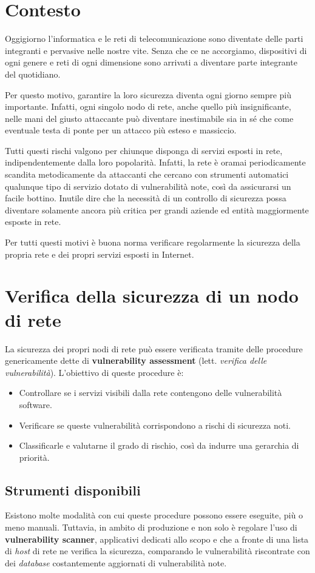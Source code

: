 \section{Contesto}
Oggigiorno l'informatica e le reti di telecomunicazione sono diventate delle parti integranti e pervasive nelle nostre vite. Senza che ce ne accorgiamo, dispositivi di ogni genere e reti di ogni dimensione sono arrivati a diventare parte integrante del quotidiano.

Per questo motivo, garantire la loro sicurezza diventa ogni giorno sempre più importante. Infatti, ogni singolo nodo di rete, anche quello più insignificante, nelle mani del giusto attaccante può diventare inestimabile sia in sé che come eventuale testa di ponte per un attacco più esteso e massiccio.

Tutti questi rischi valgono per chiunque disponga di servizi esposti in rete, indipendentemente dalla loro popolarità. Infatti, la rete è oramai periodicamente scandita metodicamente da attaccanti che cercano con strumenti automatici qualunque tipo di servizio dotato di vulnerabilità note, così da assicurarsi un facile bottino. Inutile dire che la necessità di un controllo di sicurezza possa diventare solamente ancora più critica per grandi aziende ed entità maggiormente esposte in rete.

Per tutti questi motivi è buona norma verificare regolarmente la sicurezza della propria rete e dei propri servizi esposti in Internet.

\section{Verifica della sicurezza di un nodo di rete}
La sicurezza dei propri nodi di rete può essere verificata tramite delle procedure genericamente dette di \textbf{vulnerability assessment} (lett. \emph{verifica delle vulnerabilità}). L'obiettivo di queste procedure è:
\begin{itemize}
    \item Controllare se i servizi visibili dalla rete contengono delle vulnerabilità software.
    \item Verificare se queste vulnerabilità corrispondono a rischi di sicurezza noti.
    \item Classificarle e valutarne il grado di rischio, così da indurre una gerarchia di priorità.
\end{itemize}

\subsection{Strumenti disponibili}
Esistono molte modalità con cui queste procedure possono essere eseguite, più o meno manuali. Tuttavia, in ambito di produzione e non solo è regolare l'uso di \textbf{vulnerability scanner}, applicativi dedicati allo scopo e che a fronte di una lista di \emph{host} di rete ne verifica la sicurezza, comparando le vulnerabilità riscontrate con dei \emph{database} costantemente aggiornati di vulnerabilità note.

